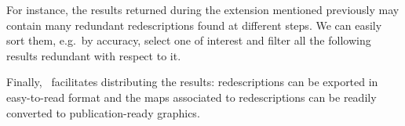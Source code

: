 For instance, the results returned during the extension
mentioned previously may contain many redundant redescriptions found
at different steps. We can easily sort them, e.g.\ by accuracy, select
one of interest and filter all the following results redundant with respect to it.

\label{sec:sharing-results}
Finally, \Siren\ facilitates distributing the results:
redescriptions can be exported in easy-to-read format and the
maps associated to redescriptions can be readily converted to
publication-ready graphics. 



